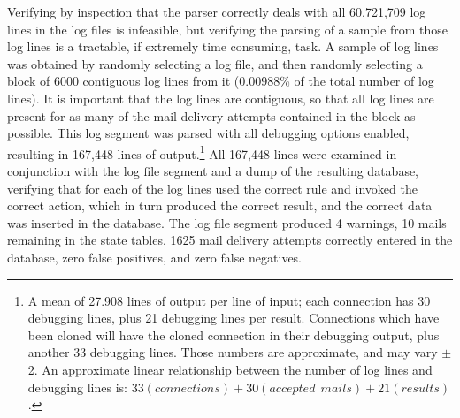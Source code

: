 
Verifying by inspection that the parser correctly deals with all 60,721,709
log lines in the \numberOFlogFILES{} log files is infeasible, but verifying
the parsing of a sample from those log lines is a tractable, if extremely
time consuming, task.  A sample of log lines was obtained by randomly
selecting a log file, and then randomly selecting a block of 6000
contiguous log lines from it (0.00988\% of the total number of log lines).
It is important that the log lines are contiguous, so that all log lines
are present for as many of the mail delivery attempts contained in the
block as possible.  This log segment was parsed with all debugging options
enabled, resulting in 167,448 lines of output.\footnote{A mean of 27.908
lines of output per line of input; each connection has 30 debugging lines,
plus 21 debugging lines per result.  Connections which have been cloned
will have the cloned connection in their debugging output, plus another 33
debugging lines.  Those numbers are approximate, and may vary $\pm{}$ 2.
An approximate linear relationship between the number of log lines and
debugging lines is: $33(connections) + 30(accepted~~mails) + 21(results)$.}
All 167,448 lines were examined in conjunction with the log file segment
and a dump of the resulting database, verifying that for each of the log
lines \parsername{} used the correct rule and invoked the correct action,
which in turn produced the correct result, and the correct data was
inserted in the database.  The log file segment produced 4 warnings, 10
mails remaining in the state tables, 1625 mail delivery attempts correctly
entered in the database, zero false positives, and zero false negatives.

